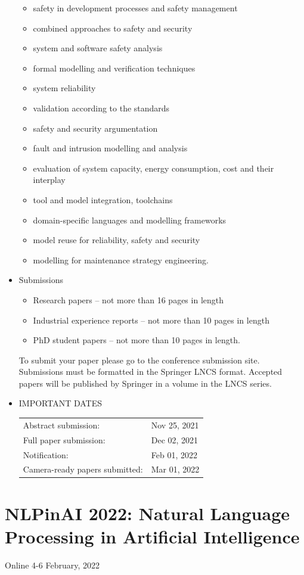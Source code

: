 \documentclass[prodmode,acmtecs]{acmsmall} %
\begin{document}
\begin{itemize}
\begin{itemize}\item  safety in development processes and safety management 
\item  combined approaches to safety and security 
\item  system and software safety analysis 
\item  formal modelling and verification techniques 
\item  system reliability 
\item  validation according to the standards 
\item  safety and security argumentation 
\item  fault and intrusion modelling and analysis 
\item  evaluation of system capacity, energy consumption, cost   and their interplay 
\item  tool and model integration, toolchains 
\item  domain-specific languages and modelling frameworks 
\item  model reuse for reliability, safety and security 
\item  modelling for maintenance strategy engineering. 
\end{itemize} 
\item  Submissions 
 
\begin{itemize}\item  Research papers – not more than 16 pages in length
\item  Industrial experience reports – not more than 10 pages in length
\item  PhD student papers – not more than 10 pages in length.
\end{itemize} 
  To submit your paper please go to the conference submission site. Submissions must be formatted in the Springer LNCS format. Accepted papers will be published by Springer in a volume in the LNCS series.  
 
\item  IMPORTANT DATES 
 
\begin{tabulary}{\linewidth}{LL}Abstract submission:  & Nov 25, 2021 \\
Full paper submission:  & Dec 02, 2021 \\
Notification:  & Feb 01, 2022 \\
Camera-ready papers submitted:  & Mar 01, 2022 \\
\end{tabulary}
 
\end{itemize}\section{NLPinAI 2022: Natural Language Processing in Artificial Intelligence}\label{NLPinAI2022}  Online 4-6 February, 2022 \\ 
\end{document}
